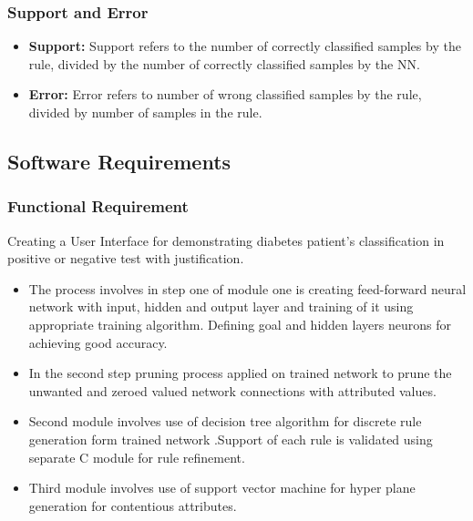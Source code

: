 \documentclass[a4paper,14pt,onecolumn]{article}
\begin{document}
\subsubsection{Support and Error}
   \begin{itemize}
   \item \textbf{Support:} Support refers to the number of correctly classified samples by the rule, divided by the number of correctly classified samples by the NN.
   \item	\textbf{Error:} Error refers to number of wrong classified samples by the rule, divided by number of samples in the rule.
   \end{itemize}

\subsection{Software Requirements}
\subsubsection{Functional Requirement}
Creating a User Interface for demonstrating diabetes patient’s classification in positive or negative test with justification. 
   \begin{itemize}
   \item The process involves in step one of module one is creating feed-forward neural network with input, hidden and output layer and training of it using appropriate training algorithm. Defining goal and hidden layers neurons for achieving good accuracy.
   \item In the second step pruning process applied on trained network to prune the unwanted and zeroed valued network connections with attributed values. 
   \item Second module involves use of decision tree algorithm for discrete rule generation form trained network .Support of each rule is validated using separate C module for rule refinement.
   \item Third module involves use of support vector machine for hyper plane generation for contentious attributes.
   \end{itemize}
\end{document}

